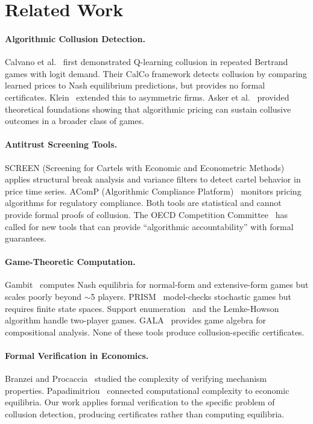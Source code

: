 \documentclass[11pt]{article}
\begin{document}
\section{Related Work}
\label{sec:related}

\paragraph{Algorithmic Collusion Detection.}
Calvano et al.~\cite{calvano2020} first demonstrated Q-learning collusion in repeated Bertrand games with logit demand. Their CalCo framework detects collusion by comparing learned prices to Nash equilibrium predictions, but provides no formal certificates. Klein~\cite{klein2021} extended this to asymmetric firms. Asker et al.~\cite{asker2022} provided theoretical foundations showing that algorithmic pricing can sustain collusive outcomes in a broader class of games.

\paragraph{Antitrust Screening Tools.}
SCREEN (Screening for Cartels with Economic and Econometric Methods)~\cite{screen} applies structural break analysis and variance filters to detect cartel behavior in price time series. AComP (Algorithmic Compliance Platform)~\cite{acomp} monitors pricing algorithms for regulatory compliance. Both tools are statistical and cannot provide formal proofs of collusion. The OECD Competition Committee~\cite{oecd2017} has called for new tools that can provide ``algorithmic accountability'' with formal guarantees.

\paragraph{Game-Theoretic Computation.}
Gambit~\cite{gambit} computes Nash equilibria for normal-form and extensive-form games but scales poorly beyond $\sim$5 players. PRISM~\cite{prism} model-checks stochastic games but requires finite state spaces. Support enumeration~\cite{supportenum} and the Lemke-Howson algorithm handle two-player games. GALA~\cite{gala} provides game algebra for compositional analysis. None of these tools produce collusion-specific certificates.

\paragraph{Formal Verification in Economics.}
Branzei and Procaccia~\cite{branzei2015} studied the complexity of verifying mechanism properties. Papadimitriou~\cite{papadimitriou2007} connected computational complexity to economic equilibria. Our work applies formal verification to the specific problem of collusion detection, producing certificates rather than computing equilibria.
\end{document}
